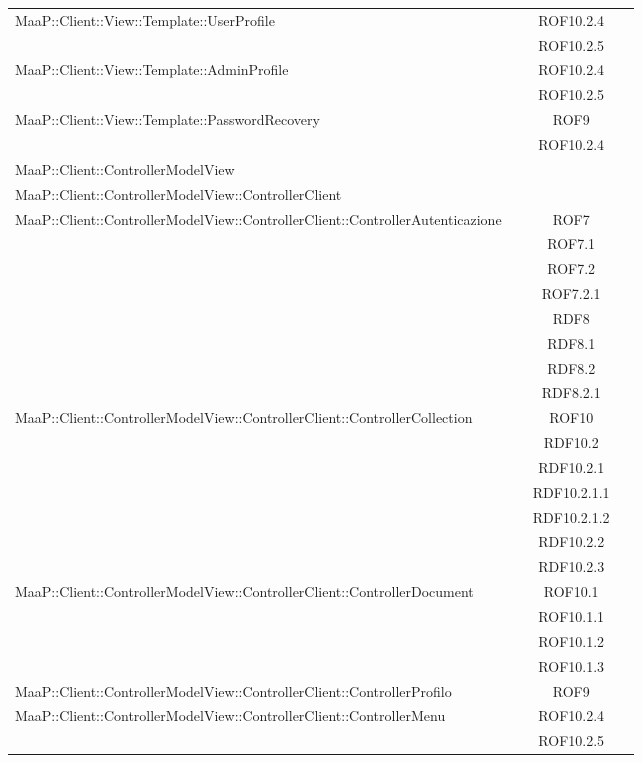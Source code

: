 \begin{center}
\begin{longtable}{|p{0.8\linewidth}|c|}
\midrule 
MaaP::Client::View::Template::UserProfile
& ROF10.2.4\\
& ROF10.2.5\\

\midrule 
MaaP::Client::View::Template::AdminProfile
& ROF10.2.4\\
& ROF10.2.5\\

\midrule 
MaaP::Client::View::Template::PasswordRecovery
& ROF9\\
& ROF10.2.4\\

\midrule 
MaaP::Client::ControllerModelView
& \\

\midrule 
MaaP::Client::ControllerModelView::ControllerClient
& \\

\midrule 
MaaP::Client::ControllerModelView::ControllerClient::ControllerAutenticazione
& ROF7\\
& ROF7.1\\
& ROF7.2\\
& ROF7.2.1\\
& RDF8\\
& RDF8.1\\
& RDF8.2\\
& RDF8.2.1\\

\midrule 
MaaP::Client::ControllerModelView::ControllerClient::ControllerCollection
& ROF10\\
& RDF10.2\\
& RDF10.2.1\\
& RDF10.2.1.1\\
& RDF10.2.1.2\\
& RDF10.2.2\\
& RDF10.2.3\\


\midrule 
MaaP::Client::ControllerModelView::ControllerClient::ControllerDocument
& ROF10.1\\
& ROF10.1.1\\
& ROF10.1.2\\
& ROF10.1.3\\


\midrule 
MaaP::Client::ControllerModelView::ControllerClient::ControllerProfilo
& ROF9\\

\midrule 
MaaP::Client::ControllerModelView::ControllerClient::ControllerMenu
& ROF10.2.4\\
& ROF10.2.5\\



\end{longtable}
\end{center}
